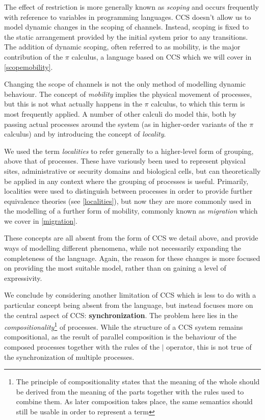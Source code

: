The effect of restriction is more generally known as \emph{scoping} and
occurs frequently with reference to variables in programming languages.
CCS doesn't allow us to model dynamic changes in the scoping of
channels.  Instead, scoping is fixed to the static arrangement provided
by the initial system prior to any transitions.  The addition of dynamic
scoping, often referred to as mobility, is the major contribution of the
$\pi$ calculus, a language based on CCS which we will cover in
\ref{scopemobility}.

Changing the scope of channels is not the only method of modelling
dynamic behaviour.  The concept of \emph{mobility} implies the physical
movement of processes, but this is not what actually happens in the
$\pi$ calculus, to which this term is most frequently applied.  A number
of other calculi do model this, both by passing actual processes around
the system (as in higher-order variants of the $\pi$ calculus) and by
introducing the concept of \emph{locality}.

We used the term \emph{localities} to refer generally to a higher-level
form of grouping, above that of processes.  These have variously been
used to represent physical sites, administrative or security domains and
biological cells, but can theoretically be applied in any context where
the grouping of processes is useful.  Primarily, localities were used to
distinguish between processes in order to provide further equivalence
theories (see \ref{localities}), but now they are more commonly used in
the modelling of a further form of mobility, commonly known as
\emph{migration} which we cover in \ref{migration}.

These concepts are all absent from the form of CCS we detail above, and
provide ways of modelling different phenomena, while not necessarily
expanding the completeness of the language.  Again, the reason for these
changes is more focused on providing the most suitable model, rather
than on gaining a level of expressivity.

We conclude by considering another limitation of CCS which is less to do
with a particular concept being absent from the language, but instead
focuses more on the central aspect of CCS: \textbf{synchronization}.
The problem here lies in the \emph{compositionality}\footnote{The
principle of compositionality states that the meaning of the whole
should be derived from the meaning of the parts together with the rules
used to combine them.  As later composition takes place, the same
semantics should still be usable in order to represent a term} of
processes.  While the structure of a CCS system remains compositional,
as the result of parallel composition is the behaviour of the composed
processes together with the rules of the $|$ operator, this is not true
of the synchronization of multiple processes.

